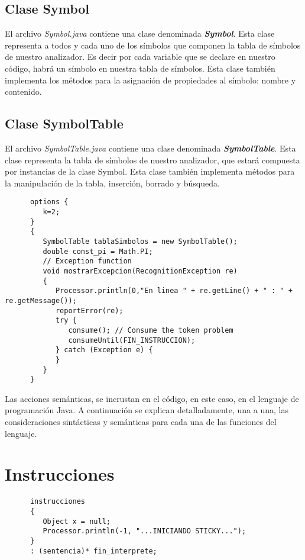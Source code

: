       \subsection{Clase Symbol}
      El archivo \textit{Symbol.java} contiene una clase denominada \textbf{\textit{Symbol}}. Esta clase representa a todos y cada uno de los símbolos que  
      componen la tabla de símbolos de nuestro analizador. Es decir por cada variable que se declare en nuestro código, habrá un símbolo
      en nuestra tabla de símbolos. Esta clase también implementa los métodos para la asignación de propiedades al símbolo: nombre y contenido. 

      \subsection{Clase SymbolTable}
      El archivo \textit{SymbolTable.java} contiene una clase denominada \textbf{\textit{SymbolTable}}. Esta clase representa la tabla de símbolos de nuestro 
      analizador, que estará compuesta por instancias de la clase Symbol. Esta clase también implementa métodos para la manipulación de
      la tabla, inserción, borrado y búsqueda. 


   \begin{lstlisting}
      options {
         k=2; 
      }      
      {
         SymbolTable tablaSimbolos = new SymbolTable();
         double const_pi = Math.PI;
         // Exception function
         void mostrarExcepcion(RecognitionException re)
         {
            Processor.println(0,"En linea " + re.getLine() + " : " + re.getMessage());
            reportError(re);
            try {
               consume(); // Consume the token problem
               consumeUntil(FIN_INSTRUCCION);
            } catch (Exception e) {
            }
         }
      }
    \end{lstlisting}
   Las acciones semánticas, se incrustan en el código, en este caso, en el lenguaje de programación Java. A continuación se explican
   detalladamente, una a una, las consideraciones sintácticas y semánticas para cada una de las funciones del lenguaje.


   \section{Instrucciones}
   \begin{lstlisting}
      instrucciones 
      {
         Object x = null;
         Processor.println(-1, "...INICIANDO STICKY...");   
      }
      : (sentencia)* fin_interprete;
   \end{lstlisting}

